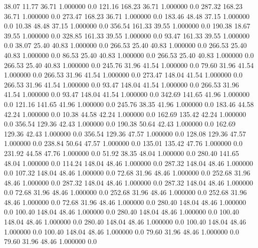    38.07   11.77   36.71    1.000000    0.0
  121.16  168.23   36.71    1.000000    0.0
  287.32  168.23   36.71    1.000000    0.0
  273.47  168.23   36.71    1.000000    0.0
  183.46   48.48   37.15    1.000000    0.0
   10.38   48.48   37.15    1.000000    0.0
  356.54  161.33   39.55    1.000000    0.0
  190.38   18.67   39.55    1.000000    0.0
  328.85  161.33   39.55    1.000000    0.0
   93.47  161.33   39.55    1.000000    0.0
   38.07   25.40   40.83    1.000000    0.0
  266.53   25.40   40.83    1.000000    0.0
  266.53   25.40   40.83    1.000000    0.0
   86.53   25.40   40.83    1.000000    0.0
  266.53   25.40   40.83    1.000000    0.0
  266.53   25.40   40.83    1.000000    0.0
  245.76   31.96   41.54    1.000000    0.0
   79.60   31.96   41.54    1.000000    0.0
  266.53   31.96   41.54    1.000000    0.0
  273.47  148.04   41.54    1.000000    0.0
  266.53   31.96   41.54    1.000000    0.0
   93.47  148.04   41.54    1.000000    0.0
  266.53   31.96   41.54    1.000000    0.0
   93.47  148.04   41.54    1.000000    0.0
  342.69  141.65   41.96    1.000000    0.0
  121.16  141.65   41.96    1.000000    0.0
  245.76   38.35   41.96    1.000000    0.0
  183.46   44.58   42.24    1.000000    0.0
   10.38   44.58   42.24    1.000000    0.0
  162.69  135.42   42.24    1.000000    0.0
  356.54  129.36   42.43    1.000000    0.0
  190.38   50.64   42.43    1.000000    0.0
  162.69  129.36   42.43    1.000000    0.0
  356.54  129.36   47.57    1.000000    0.0
  128.08  129.36   47.57    1.000000    0.0
  238.84   50.64   47.57    1.000000    0.0
  135.01  135.42   47.76    1.000000    0.0
  231.92   44.58   47.76    1.000000    0.0
   51.92   38.35   48.04    1.000000    0.0
  280.40  141.65   48.04    1.000000    0.0
  114.24  148.04   48.46    1.000000    0.0
  287.32  148.04   48.46    1.000000    0.0
  107.32  148.04   48.46    1.000000    0.0
   72.68   31.96   48.46    1.000000    0.0
  252.68   31.96   48.46    1.000000    0.0
  287.32  148.04   48.46    1.000000    0.0
  287.32  148.04   48.46    1.000000    0.0
   72.68   31.96   48.46    1.000000    0.0
  252.68   31.96   48.46    1.000000    0.0
  252.68   31.96   48.46    1.000000    0.0
   72.68   31.96   48.46    1.000000    0.0
  280.40  148.04   48.46    1.000000    0.0
  100.40  148.04   48.46    1.000000    0.0
  280.40  148.04   48.46    1.000000    0.0
  100.40  148.04   48.46    1.000000    0.0
  280.40  148.04   48.46    1.000000    0.0
  100.40  148.04   48.46    1.000000    0.0
  100.40  148.04   48.46    1.000000    0.0
   79.60   31.96   48.46    1.000000    0.0
   79.60   31.96   48.46    1.000000    0.0
